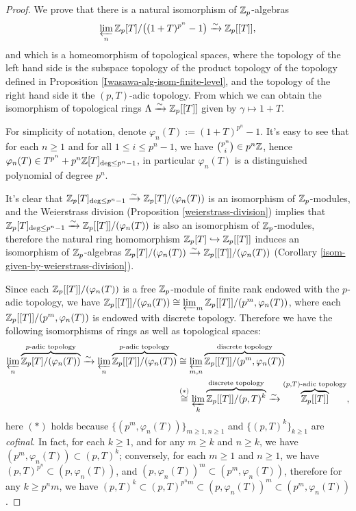 \begin{proof}
We prove that there is a natural isomorphism of ${\mathbb {Z}}_p$-algebras
$$
\varprojlim_n{\mathbb {Z}}_p[T]/\big((1+T)^{p^n}-1\big)
\xrightarrow\sim{\mathbb {Z}}_p[[T]],
$$
and which is a homeomorphism of topological spaces,
where the topology of the left hand side is the subspace topology
of the product topology of the topology defined in Proposition
\ref{Iwasawa-alg-isom-finite-level},
and the topology of the right hand side it the $(p,T)$-adic topology.
From which we can obtain the isomorphism of topological rings
$\Lambda\xrightarrow\sim{\mathbb {Z}}_p[[T]]$ given by $\gamma\mapsto 1+T$.

For simplicity of notation, denote $\varphi_n(T):=(1+T)^{p^n}-1$.
It's easy to see that for each $n\geq 1$ and for all $1\leq i\leq p^n-1$,
we have $\binom{p^n}{i}\in p^n{\mathbb {Z}}$,
hence $\varphi_n(T)\in T^{p^n}+p^n{\mathbb {Z}}[T]_{\deg\leq p^n-1}$,
in particular $\varphi_n(T)$ is a distinguished polynomial of degree $p^n$.

It's clear that ${\mathbb {Z}}_p[T]_{\deg\leq p^n-1}\xrightarrow\sim{\mathbb {Z}}_p[T]/(\varphi_n(T))$
is an isomorphism of ${\mathbb {Z}}_p$-modules,
and the Weierstrass division (Proposition \ref{weierstrass-division}) implies that
${\mathbb {Z}}_p[T]_{\deg\leq p^n-1}\xrightarrow\sim{\mathbb {Z}}_p[[T]]/(\varphi_n(T))$
is also an isomorphism of ${\mathbb {Z}}_p$-modules,
therefore the natural ring homomorphism ${\mathbb {Z}}_p[T]\hookrightarrow{\mathbb {Z}}_p[[T]]$
induces an isomorphism of ${\mathbb {Z}}_p$-algebras
${\mathbb {Z}}_p[T]/(\varphi_n(T))\xrightarrow\sim{\mathbb {Z}}_p[[T]]/(\varphi_n(T))$
(Corollary \ref{isom-given-by-weierstrass-division}).

Since each ${\mathbb {Z}}_p[[T]]/(\varphi_n(T))$ is a free ${\mathbb {Z}}_p$-module of finite rank
endowed with the $p$-adic topology, we have
${\mathbb {Z}}_p[[T]]/(\varphi_n(T))\cong\varprojlim_m{\mathbb {Z}}_p[[T]]/(p^m,\varphi_n(T))$,
where each ${\mathbb {Z}}_p[[T]]/(p^m,\varphi_n(T))$ is endowed with discrete topology.
Therefore we have the following isomorphisms of rings as well as topological spaces:
\begin{align*}
\varprojlim_n\overbrace{{\mathbb {Z}}_p[T]/(\varphi_n(T))}^{p\text{-adic topology}}
\xrightarrow\sim
\varprojlim_n\overbrace{{\mathbb {Z}}_p[[T]]/(\varphi_n(T))}^{p\text{-adic topology}}
&\cong
\varprojlim_{m,n}\overbrace{{\mathbb {Z}}_p[[T]]/(p^m,\varphi_n(T))}^{\text{discrete topology}} \\
&\stackrel{(*)}\cong
\varprojlim_k\overbrace{{\mathbb {Z}}_p[[T]]/(p,T)^k}^{\text{discrete topology}}
\xrightarrow\sim
\overbrace{{\mathbb {Z}}_p[[T]]}^{(p,T)\text{-adic topology}},
\end{align*}
here $(*)$ holds because $\{(p^m,\varphi_n(T))\}_{m\geq 1,n\geq 1}$
and $\{(p,T)^k\}_{k\geq 1}$ are \emph{cofinal}.
In fact, for each $k\geq 1$, and for any $m\geq k$ and $n\geq k$,
we have $(p^m,\varphi_n(T))\subset(p,T)^k$;
conversely, for each $m\geq 1$ and $n\geq 1$,
we have $(p,T)^{p^n}\subset(p,\varphi_n(T))$,
and $(p,\varphi_n(T))^m\subset(p^m,\varphi_n(T))$,
therefore for any $k\geq p^nm$, we have
$(p,T)^k\subset(p,T)^{p^nm}\subset(p,\varphi_n(T))^m\subset(p^m,\varphi_n(T))$.
\end{proof}

